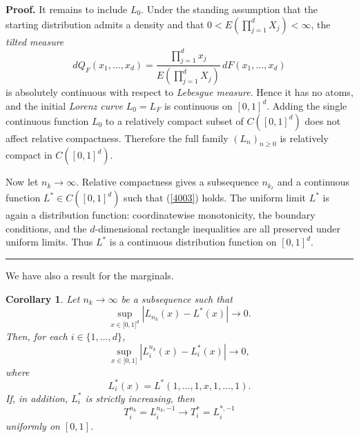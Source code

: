 \documentclass[onecolumn]{article}
\newtheorem{corollary}[theorem]{Corollary}
\newenvironment{proof}[1][Proof]{\noindent\textbf{#1.} }{\ \rule{0.5em}{0.5em}}
\begin{document}
\begin{proof}
\noindent It remains to include $L_{0}$. Under the standing assumption that
the starting distribution admits a density and that $0<E(%
\prod_{j=1}^{d}X_{j})<\infty $, the \textit{tilted measure} 
\begin{equation}
dQ_{F}(x_{1},\ldots ,x_{d})=\frac{\prod_{j=1}^{d}x_{j}}{E(%
\prod_{j=1}^{d}X_{j})}\,dF(x_{1},\ldots ,x_{d})  \label{4021}
\end{equation}%
is absolutely continuous with respect to \textit{Lebesgue measure}. Hence it
has no atoms, and the initial \textit{Lorenz curve} $L_{0}=L_{F}$ is
continuous on $[0,1]^{d}$. Adding the single continuous function $L_{0}$ to
a relatively compact subset of $C([0,1]^{d})$ does not affect relative
compactness. Therefore the full family $(L_{n})_{n\geq 0}$ is relatively
compact in $C([0,1]^{d})$.

\noindent Now let $n_{k}\rightarrow \infty $. Relative compactness gives a
subsequence $n_{k_{\ell }}$ and a continuous function $L^{\ast }\in
C([0,1]^{d})$ such that (\ref{4003}) holds. The uniform limit $L^{\ast }$ is
again a distribution function: coordinatewise monotonicity, the boundary
conditions, and the $d$-dimensional rectangle inequalities are all preserved
under uniform limits. Thus $L^{\ast }$ is a continuous distribution function
on $[0,1]^{d}$.
\end{proof}

We have also a result for the marginals.

\begin{corollary}
\textbf{\label{AA-d} }Let $n_{k}\rightarrow \infty $ be a subsequence such
that 
\begin{equation}
\sup_{x\in \lbrack 0,1]^{d}}|L_{n_{k}}(x)-L^{\ast }(x)|\rightarrow 0.
\label{4025}
\end{equation}%
Then, for each $i\in \{1,\ldots ,d\}$, 
\begin{equation}
\sup_{x\in \lbrack 0,1]}|L_{i}^{n_{k}}(x)-L_{i}^{\ast }(x)|\rightarrow 0,
\label{4026}
\end{equation}%
where 
\begin{equation}
L_{i}^{\ast }(x)=L^{\ast }(1,\ldots ,1,x,1,\ldots ,1).  \label{4027}
\end{equation}%
If, in addition, $L_{i}^{\ast }$ is strictly increasing, then 
\begin{equation}
T_{i}^{n_{k}}=L_{i}^{n_{k},-1}\rightarrow T_{i}^{\ast }=L_{i}^{\ast ,-1}
\label{4028}
\end{equation}%
uniformly on $[0,1]$.
\end{corollary}
\end{document}

